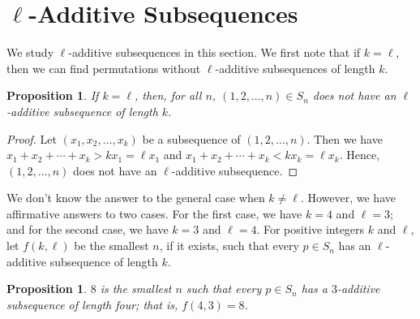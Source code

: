 \documentclass[11pt]{article}
\newtheorem{proposition}[theorem]{Proposition}
\theoremstyle{definition}
\begin{document}
\section{$\ell$-Additive Subsequences}\label{Section:l-add}
We study $\ell$-additive subsequences in this section. We first note that if $k=\ell$, then we can find permutations without $\ell$-additive subsequences of length $k$.

\begin{proposition}
    If $k=\ell$, then, for all $n$, $(1,2,\ldots,n)\in S_n$ does not have an $\ell$-additive subsequence of length $k$.
\end{proposition}
\begin{proof}
    Let $(x_1,x_2,\ldots,x_k)$ be a subsequence of $(1,2,\ldots,n)$. Then we have $x_1+x_2+\cdots+x_k>kx_1=\ell x_1$ and $x_1+x_2+\cdots+x_k<kx_k=\ell x_k$. Hence, $(1,2,\ldots,n)$ does not have an $\ell$-additive subsequence.
\end{proof}

We don't know the answer to the general case when $k\neq\ell$. However, we have affirmative answers to two cases. For the first case, we have $k=4$ and $\ell=3$; and for the second case, we have $k=3$ and $\ell=4$. For positive integers $k$ and $\ell$, let $f(k,\ell)$ be the smallest $n$, if it exists, such that every $p\in S_n$ has an $\ell$-additive subsequence of length $k$.

\begin{proposition}
$8$ is the smallest $n$ such that every $p\in S_n$ has a $3$-additive subsequence of length four; that is, $f(4,3)=8$.
\end{proposition}
\end{document}

